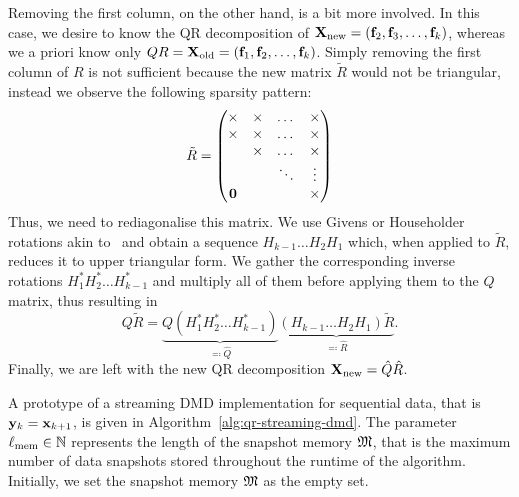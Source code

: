 Removing the first column, on the other hand, is a bit more involved. In this case, we desire to know the QR decomposition of $\mathbf{X}_\text{new} = (\mathbf{f}_2, \mathbf{f}_3, \dots, \mathbf{f}_k)$, whereas we a priori know only $Q R = \mathbf{X}_\text{old} = (\mathbf{f}_1, \mathbf{f}_2, \dots, \mathbf{f}_k)$. Simply removing the first column of $R$ is not sufficient because the new matrix $\tilde{R}$ would not be triangular, instead we observe the following sparsity pattern:
\begin{equation*}
    \tilde{R} = \begin{pmatrix}
        \times & \times & \dots & \times \\
        \times & \times & \dots & \times \\
         & \times & \dots & \times \\
         & & \ddots & \vdots \\
        \mathbf{0} & & & \times \\
    \end{pmatrix}
\end{equation*}
Thus, we need to rediagonalise this matrix. We use Givens or Householder rotations akin to~\cite{Daniel1976} and obtain a sequence $H_{k - 1} \dots H_2 H_1$ which, when applied to $\tilde{R}$, reduces it to upper triangular form. We gather the corresponding inverse rotations $H_1^* H_2^* \dots H_{k - 1}^*$ and multiply all of them before applying them to the $Q$ matrix, thus resulting in
\begin{equation*}
    Q \tilde{R} = \underbrace{Q (H_1^* H_2^* \dots H_{k - 1}^*)}_{\eqqcolon \hat{Q}} \underbrace{(H_{k - 1} \dots H_2 H_1) \tilde{R}}_{\eqqcolon \hat{R}}.
\end{equation*}
Finally, we are left with the new QR decomposition $\mathbf{X}_\text{new} = \hat{Q} \hat{R}$.

A prototype of a streaming DMD implementation for sequential data, that is $\mathbf{y}_k = \mathbf{x}_{k + 1}$, is given in Algorithm~\ref{alg:qr-streaming-dmd}. The parameter $\ell_\text{mem} \in \mathbb{N}$ represents the length of the snapshot memory $\mathfrak{M}$, that is the maximum number of data snapshots stored throughout the runtime of the algorithm. Initially, we set the snapshot memory $\mathfrak{M}$ as the empty set.

